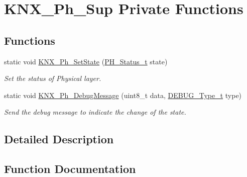 \hypertarget{group___k_n_x___p_h___sup___private___functions}{}\section{K\+N\+X\+\_\+\+Ph\+\_\+\+Sup Private Functions}
\label{group___k_n_x___p_h___sup___private___functions}
\subsection*{Functions}
\begin{DoxyCompactItemize}
\item 
static void \hyperlink{group___k_n_x___p_h___sup___private___functions_ga8253bed4aa2e3d7bfa9c1de3604668e0}{K\+N\+X\+\_\+\+Ph\+\_\+\+Set\+State} (\hyperlink{group___k_n_x___p_h___sup___exported___types_ga5b665a94bef912fbfbea7cc949ed0e49}{P\+H\+\_\+\+Status\+\_\+t} state)
\begin{DoxyCompactList}\small\item\em Set the status of Physical layer. \end{DoxyCompactList}\item 
static void \hyperlink{group___k_n_x___p_h___sup___private___functions_gaad432d8797e22b886ab169401decc3dd}{K\+N\+X\+\_\+\+Ph\+\_\+\+Debug\+Message} (uint8\+\_\+t data, \hyperlink{group___debug___exported___types_gacb1775677105967978fae4d9155cca26}{D\+E\+B\+U\+G\+\_\+\+Type\+\_\+t} type)
\begin{DoxyCompactList}\small\item\em Send the debug message to indicate the change of the state. \end{DoxyCompactList}\end{DoxyCompactItemize}


\subsection{Detailed Description}


\subsection{Function Documentation}
